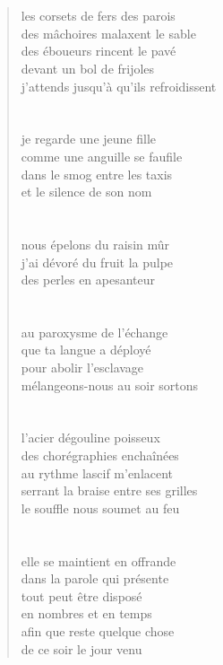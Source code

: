 \documentclass[a4paper,12pt,openright]{memoir}
\begin{document}
\begin{verse}
\section*{}
les corsets de fers des parois\\
des mâchoires malaxent le sable\\
des éboueurs rincent le pavé\\
devant un bol de frijoles\\
j’attends jusqu'à qu’ils refroidissent

\section*{}
je regarde une jeune fille\\
comme une anguille se faufile\\
dans le smog entre les taxis\\
et le silence de son nom

\section*{}
nous épelons du raisin mûr\\
j'ai dévoré du fruit la pulpe\\
des perles en apesanteur

\section*{}
au paroxysme de l'échange\\
que ta langue a déployé\\
pour abolir l'esclavage\\
mélangeons-nous au soir sortons

\section*{}
l'acier dégouline poisseux\\
des chorégraphies enchaînées\\
au rythme lascif m'enlacent\\
serrant la braise entre ses grilles\\
le souffle nous soumet au feu

\section*{}
elle se maintient en offrande\\
dans la parole qui présente\\
tout peut être disposé\\
en nombres et en temps\\
afin que reste quelque chose\\
de ce soir le jour venu
\end{verse}
\vspace{2cm}
\begin{center}
\LARGE{\aldineleft}
\end{center}
\end{document}
